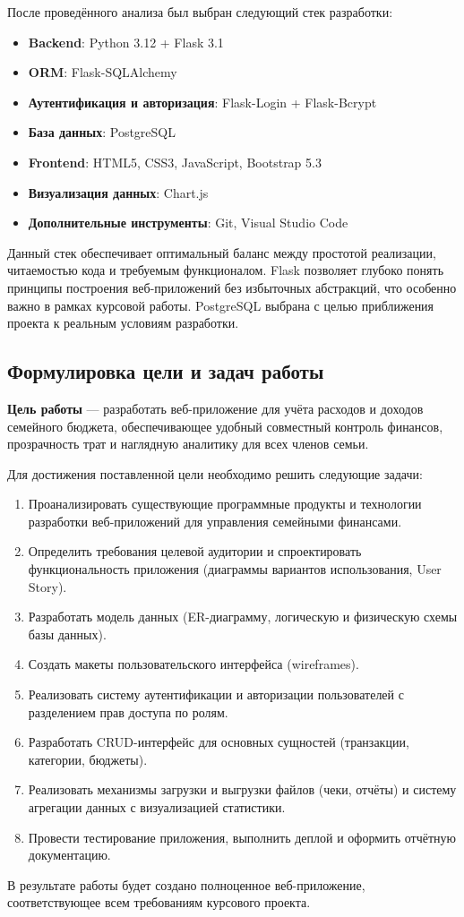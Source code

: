 После проведённого анализа был выбран следующий стек разработки:

\begin{itemize}
    \item \textbf{Backend}: Python 3.12 + Flask 3.1
    \item \textbf{ORM}: Flask-SQLAlchemy
    \item \textbf{Аутентификация и авторизация}: Flask-Login + Flask-Bcrypt
    \item \textbf{База данных}: PostgreSQL
    \item \textbf{Frontend}: HTML5, CSS3, JavaScript, Bootstrap 5.3
    \item \textbf{Визуализация данных}: Chart.js\cite{chartjs}
    \item \textbf{Дополнительные инструменты}: Git, Visual Studio Code
\end{itemize}

Данный стек обеспечивает оптимальный баланс между простотой реализации, читаемостью кода и требуемым функционалом. Flask позволяет глубоко понять принципы построения веб-приложений без избыточных абстракций, что особенно важно в рамках курсовой работы. PostgreSQL выбрана с целью приближения проекта к реальным условиям разработки.



\subsection{Формулировка цели и задач работы}

\textbf{Цель работы} — разработать веб-приложение для учёта расходов и доходов семейного бюджета, обеспечивающее удобный совместный контроль финансов, прозрачность трат и наглядную аналитику для всех членов семьи.

Для достижения поставленной цели необходимо решить следующие задачи:

\begin{enumerate}
    \item Проанализировать существующие программные продукты и технологии разработки веб-приложений для управления семейными финансами.
    \item Определить требования целевой аудитории и спроектировать функциональность приложения (диаграммы вариантов использования, User Story).
    \item Разработать модель данных (ER-диаграмму, логическую и физическую схемы базы данных).
    \item Создать макеты пользовательского интерфейса (wireframes).
    \item Реализовать систему аутентификации и авторизации пользователей с разделением прав доступа по ролям.
    \item Разработать CRUD-интерфейс для основных сущностей (транзакции, категории, бюджеты).
    \item Реализовать механизмы загрузки и выгрузки файлов (чеки, отчёты) и систему агрегации данных с визуализацией статистики.
    \item Провести тестирование приложения, выполнить деплой и оформить отчётную документацию.
\end{enumerate}

В результате работы будет создано полноценное веб-приложение, соответствующее всем требованиям курсового проекта.
